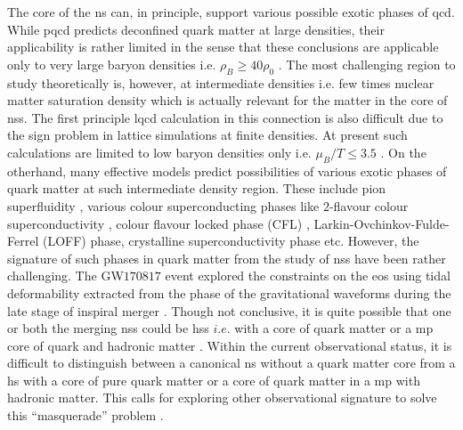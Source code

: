 \documentclass[a4paper, 11pt]{article}
\begin{document}
The core of the \ac{ns} can, in principle, support various  possible exotic phases of \ac{qcd}. While \ac{pqcd} predicts deconfined quark matter at large densities, their applicability is rather limited in the sense that these conclusions are applicable only to very large baryon densities i.e. $\rho_B \geq 40\rho_0$ \cite{Gorda:2018}.  The most challenging region to study theoretically is, however, at intermediate densities i.e. few times nuclear matter saturation density which is actually relevant for the matter in the core of \ac{ns}s. The first principle \ac{lqcd} calculation in this connection is also difficult due to the sign problem in lattice simulations at finite densities. At present such calculations are limited to low baryon densities only i.e. $\mu_B/T \le 3.5$ \cite{Borsanyi:2021}. On the otherhand, many effective models predict possibilities of various exotic phases of quark matter at such intermediate density region. These include pion superfluidity \cite{Son:2001, Ebert:2005, Barducci:2004}, various colour superconducting phases like $2$-flavour colour superconductivity \cite{Alford:1997, Mishra:2003, Abhishek:2021}, colour flavour locked phase (CFL) \cite{Alford:1998}, Larkin-Ovchinkov-Fulde-Ferrel (LOFF) \cite{Mannarelli:2006, Rajagopal:2006} phase, crystalline superconductivity phase etc. However, the signature of such phases in quark matter from the study of \ac{ns}s have been rather challenging. The GW$170817$ \cite{Ligo:2018} event explored the constraints on the \ac{eos} using tidal deformability extracted from the phase of the gravitational waveforms during the late stage of inspiral merger \cite{Radice:2018, Malik:2018, Li:2018, Hu:2020, De:2018, Chatziioannou:2018}. Though not conclusive, it is quite possible that one or both the merging \ac{ns}s could be \ac{hs}s $i.e.$ with a core of quark matter or a \ac{mp} core of quark and hadronic matter \cite{Paschalidis:2017, Nandi:2017}. Within the current observational status, it is difficult to distinguish between a canonical \ac{ns} without a quark matter core from a \ac{hs} with a core of pure quark matter or a core of quark matter in a \ac{mp}  with hadronic matter. This calls for exploring other observational signature to solve this ``masquerade'' problem \cite{Alford:2004, Wei:2018}.
\end{document}
